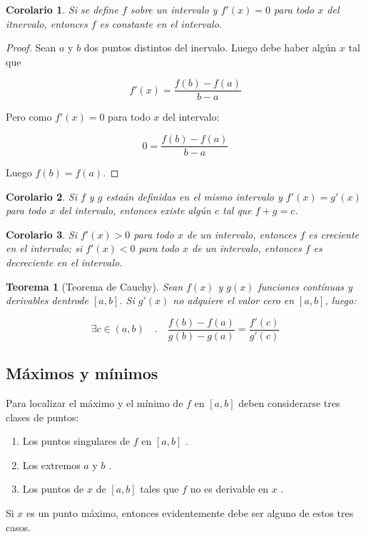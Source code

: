 \documentclass[12pt,a4paper]{extarticle}
\newtheorem{theorem}{Teorema}[section]
\newtheorem{corol}{Corolario}[theorem]
\begin{document}
\begin{corol}
Si se define \(f\) sobre un intervalo y \(f'(x)=0\) para todo \(x\)
del itnervalo, entonces \(f\) es constante en el intervalo.
\end{corol}
\begin{proof}
Sean \(a\) y \(b\) dos puntos distintos del inervalo. Luego debe haber alg\'un
\(x\) tal que

\[f'(x)=\frac{f(b)-f(a)}{b-a}\]

Pero como \(f'(x)=0\) para todo \(x\) del intervalo:

\[0=\frac{f(b)-f(a)}{b-a}\]

Luego \(f(b) = f(a) \).

\end{proof}
\begin{corol}
Si \(f\) y \(g\) esta\'an definidas en el mismo intervalo y \(f'(x) = g'(x)\)
para todo \(x\) del intervalo, entonces existe alg\'un \(c\) tal que \(f + g =
c \).
\end{corol}

\begin{corol}
Si \(f'(x) > 0\) para todo \(x\) de un intervalo, entonces \(f\) es
creciente en el intervalo; si \(f'(x) < 0\) para todo \(x\) de un intervalo, entonces \(f\) es
decreciente en el intervalo.
\end{corol}
\begin{theorem}[Teorema de Cauchy]
Sean \(f(x)\) y \(g(x)\) funciones cont\'inuas y derivables dentrode
\([a,b]\). Si \(g'(x)\) no adquiere el valor cero en \([a,b]\), luego:

\[ \exists c \in (a,b) \quad . \quad \frac{f(b)-f(a)}{g(b)-g(a)} = \frac{f'(c)}{g'(c)} \]
\end{theorem}
\subsection{M\'aximos y m\'inimos}
Para localizar el m\'aximo y el m\'inimo de \( f \) en \( [a,b] \)  deben considerarse
tres clases de puntos:

\begin{enumerate}
\item Los puntos singulares de \( f \) en \( [a,b] \) .
\item Los extremos \( a \) y \( b \) .
\item Los puntos de \( x \)  de \( [a,b] \)  tales que \( f \) no es
  derivable en \( x \) .
\end{enumerate}

Si \( x \) es un punto m\'aximo, entonces evidentemente debe ser
alguno de estos tres casos.
\end{document}
